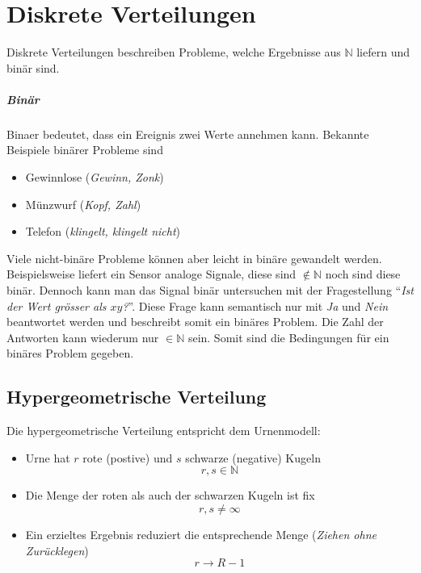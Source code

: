 



\chapter{Diskrete Verteilungen}
Diskrete Verteilungen beschreiben Probleme, welche
Ergebnisse aus $\mathbb{N}$ liefern und binär sind.

\paragraph{Binär}
\gls{Binaer} bedeutet, dass ein Ereignis zwei Werte annehmen kann. Bekannte
Beispiele binärer Probleme sind
\begin{itemize}
	\item Gewinnlose \hfill{} (\emph{Gewinn, Zonk})
	\item Münzwurf \hfill{} (\emph{Kopf, Zahl})
	\item Telefon \hfill{} (\emph{klingelt, klingelt nicht})
\end{itemize}
Viele nicht-binäre Probleme können aber leicht in binäre gewandelt
werden. Beispielsweise liefert ein Sensor analoge Signale, diese sind
$\notin \mathbb{N}$ noch sind diese binär. 
Dennoch kann man das Signal binär
untersuchen mit der Fragestellung 
"`\emph{Ist der Wert grösser als $xy$?}"'.
Diese Frage kann semantisch nur mit \emph{Ja} und \emph{Nein} beantwortet
werden und beschreibt somit ein binäres Problem. Die Zahl der Antworten
kann wiederum nur $\in \mathbb{N}$ sein. Somit sind die Bedingungen 
für ein binäres Problem gegeben.

\newpage
\section{Hypergeometrische Verteilung}
Die hypergeometrische Verteilung entspricht dem \gls{Urnenmodell}:
\begin{itemize}
	\item Urne hat $r$ rote (postive) und $s$ schwarze (negative)
		Kugeln
		\[ r,s \in \mathbb{N} \]
	\item Die Menge der roten als auch der schwarzen Kugeln ist fix 
		\[ r,s \neq \infty \]
	\item Ein erzieltes Ergebnis reduziert die entsprechende Menge
		(\emph{Ziehen ohne Zurücklegen})
		\[ r \rightarrow  R - 1\]
\end{itemize}

